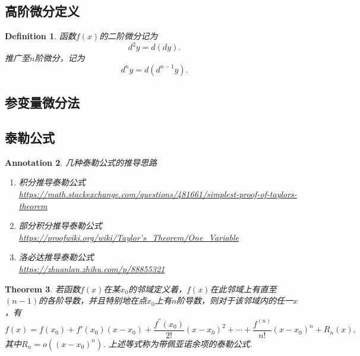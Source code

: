 \documentclass{article}
\newtheorem{theorem}{Theorem}[section]
\newtheorem{definition}[theorem]{Definition}
\newtheorem{annotation}[theorem]{Annotation}
\begin{document}
\subsection{高阶微分定义}

\begin{definition}
\rm 函数$f(x)$的二阶微分记为
$$
d^2y = d(dy).
$$
推广至$n$阶微分，记为
$$
d^ny = d(d^{n-1}y).
$$
\end{definition}

\subsection{参变量微分法}

\newpage
\subsection{泰勒公式}

\begin{annotation}
\rm 几种泰勒公式的推导思路
\begin{enumerate}
	\item 积分推导泰勒公式 \\
	\url{https://math.stackexchange.com/questions/481661/simplest-proof-of-taylors-theorem} 
	\item 部分积分推导泰勒公式 \\ 
	\url{https://proofwiki.org/wiki/Taylor's_Theorem/One_Variable}
	\item 洛必达推导泰勒公式 \\
	\url{https://zhuanlan.zhihu.com/p/88855321}
\end{enumerate} 
\end{annotation}

\begin{theorem}
\rm 若函数$f(x)$在某$x_0$的邻域定义着，$f(x)$在此邻域上有直至$(n-1)$的各阶导数，并且特别地在点$x_0$上有$n$阶导数，则对于该邻域内的任一$x$，有
$$
f(x) = f(x_0) + f'(x_0)(x-x_0) + \frac{f^{''}(x_0)}{2!}(x-x_0)^2 + \cdots + \frac{f^{(n)}}{n!}(x-x_0)^n + R_n(x),
$$
其中$R_n = o((x-x_0)^n)$. 上述等式称为{\color{red}带佩亚诺余项的泰勒公式}.
\end{theorem}
\end{document}
